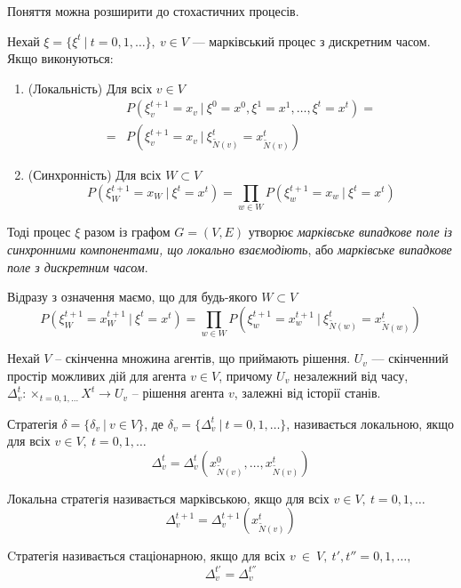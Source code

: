 \documentclass[oneside,14pt]{extarticle}
\begin{document}
Поняття можна розширити до стохастичних процесів.
\begin{definition}
\label{def:mrftime}
Нехай \(\xi = \{\xi^t\ |\ t=0,1,\ldots\},\ v \in V \) — марківський процес з дискретним часом. 
Якщо виконуються:

\begin{enumerate}
    \item (Локальність) Для всіх \(v \in V\)
    \begin{align*}
    &P(\xi_v^{t+1} = x_v\ |\ \xi^0 = x^0, \xi^1 = x^1, \ldots, \xi^t = x^t) = \\
    = &P(\xi_v^{t+1} = x_v\ |\ \xi_{\tilde N(v)}^t = x_{\tilde N(v)}^t )
    \end{align*}
    \item (Синхронність) Для всіх \(W \subset V\) \[P(\xi^{t+1}_W = x_W\ |\ \xi^t = x^t) = \prod_{w \in W} P(\xi^{t+1}_w = x_w\ |\ \xi^t = x^t) \]
\end{enumerate}

Тоді процес \(\xi\) разом із графом \(G = (V, E)\) утворює \textit{марківське випадкове поле із синхронними компонентами, що локально взаємодіють}, або \textit{марківське випадкове поле з дискретним часом}. 
\end{definition}

Відразу з означення маємо, що для будь-якого \(W \subset V\)
\[P(\xi_W^{t+1} = x_W^{t+1}\ |\ \xi^t = x^t) = \prod_{w \in W} P(\xi_w^{t+1} = x_w^{t+1}\ |\ \xi_{\tilde{N}(w)}^t = x_{\tilde{N}(w)}^t)\]

Нехай \(V\) – скінченна множина агентів, що приймають рішення. \(U_v\) — скінченний простір можливих дій для агента \(v \in V\), причому \(U_v\) незалежний від часу, \(\Delta_v^t: \times_{t=0,1,\ldots}X^t \rightarrow U_v\) – рішення агента \(v\), залежні від історії станів. 

\begin{definition}
Стратегія \(\delta = \{\delta_v\ |\ v \in V\}\), де \(\delta_v = \{\Delta_v^t\ |\ t=0,1,\ldots\}\), називається локальною, якщо для всіх \(v \in V,\ t = 0, 1, \ldots\)
\[\Delta_v^t = \Delta_v^t(x_{\tilde{N}(v)}^0, \ldots, x_{\tilde{N}(v)}^t)\]
\end{definition}

\begin{definition}
Локальна стратегія називається марківською, якщо для всіх \(v \in V,\ t = 0, 1, \ldots\) 
\[\Delta_v^{t+1} = \Delta_v^{t+1}(x_{\tilde{N}(v)}^t)\]
\end{definition}

\begin{definition}
Cтратегія називається стаціонарною, якщо для всіх \(v~\in~V,\ t', t'' = 0, 1, \ldots,\)
\[\Delta_v^{t'} = \Delta_v^{t''}\]
\end{definition}
\end{document}
